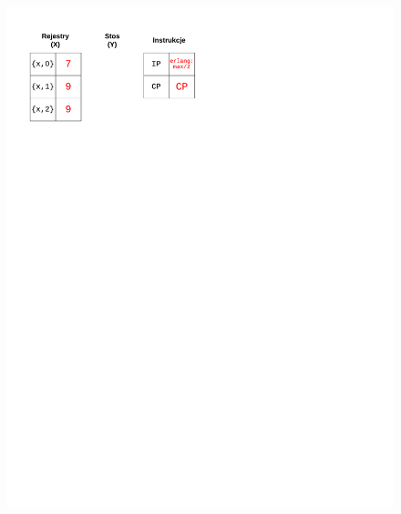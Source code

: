 \begin{figure}
\begin{multicols}{2}
\vspace{-4mm}
\begin{Figure}
 \centering
 \includegraphics[scale=0.65, clip, trim=10mm 215mm 110mm 10mm]{interpreter_max_7}
\label{fig:max7}
\end{Figure}


\end{multicols}
\end{figure}
